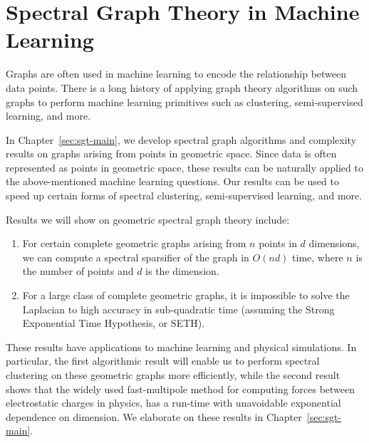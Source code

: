 \section{Spectral Graph Theory in Machine
  Learning}\label{sec:sgt}
  Graphs are often used in machine learning to encode the relationship
  between data points. There is a long history of applying graph theory
  algorithms on such graphs to perform machine learning primitives such
  as clustering, semi-supervised learning, and more.

  In Chapter~\ref{sec:sgt-main}, we develop spectral graph
  algorithms and complexity results on graphs arising from points in geometric space. Since
  data is often represented as points in geometric space, these
  results can be naturally applied to the above-mentioned machine
  learning questions. Our results can be used to speed up certain forms of spectral clustering, semi-supervised
  learning, and more.

  Results we will show on geometric spectral graph theory include: 
  \begin{enumerate}
  \item For certain complete geometric graphs arising from $n$ points in
  $d$ dimensions, we can compute a spectral
  sparsifier of the graph in $O(nd)$ time, where $n$ is the number of
  points and $d$ is the dimension.
  \item  For a large class of complete geometric graphs, it is
  impossible to solve the Laplacian to high accuracy in sub-quadratic
  time (assuming the Strong Exponential Time Hypothesis, or SETH).
  \end{enumerate}
  These results have applications to machine learning and physical
  simulations. In particular, the first algorithmic result will enable us to perform
  spectral clustering on these geometric graphs more efficiently, while
  the second result shows that the widely used fast-multipole method for
  computing forces between electrostatic charges in physics, has a
  run-time with unavoidable exponential dependence on dimension. We
  elaborate on these results in Chapter~\ref{sec:sgt-main}.
  

